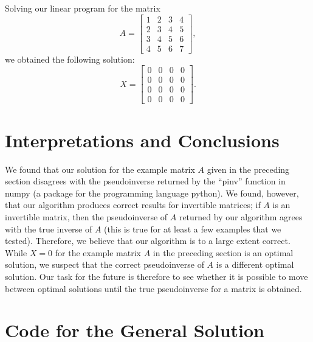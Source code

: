 \documentclass[12pt, a4paper, notitlepage]{report}
\renewcommand{\thesection}{\arabic{section}.  }
\begin{document}
Solving our linear program for the matrix
\[ A =
\begin{bmatrix}
1 & 2 & 3 & 4\\
2 & 3 & 4 & 5 \\
3 & 4 & 5 & 6 \\
4 & 5 & 6 & 7
\end{bmatrix}, \]
we obtained the following solution:
\[ X =
\begin{bmatrix}
0 & 0 & 0 & 0 \\
0 & 0 & 0 & 0 \\
0 & 0 & 0 & 0 \\
0 & 0 & 0 & 0
\end{bmatrix}. \]

\section{Interpretations and Conclusions}

We found that our solution for the example matrix $A$ given in the preceding section disagrees with the pseudoinverse returned by the ``pinv'' function in numpy (a package for the programming language python). We found, however, that our algorithm produces correct results for invertible matrices; if $A$ is an invertible matrix, then the pseudoinverse of $A$ returned by our algorithm agrees with the true inverse of $A$ (this is true for at least a few examples that we tested). Therefore, we believe that our algorithm is to a large extent correct. While $X=0$ for the example matrix $A$ in the preceding section is an optimal solution, we suspect that the correct pseudoinverse of $A$ is a different optimal solution. Our task for the future is therefore to see whether it is possible to move between optimal solutions until the true pseudoinverse for a matrix is obtained.


\appendix
\renewcommand{\thesection}{A\arabic{section}.  }

\section{Code for the General Solution} \label{code}


\end{document}
